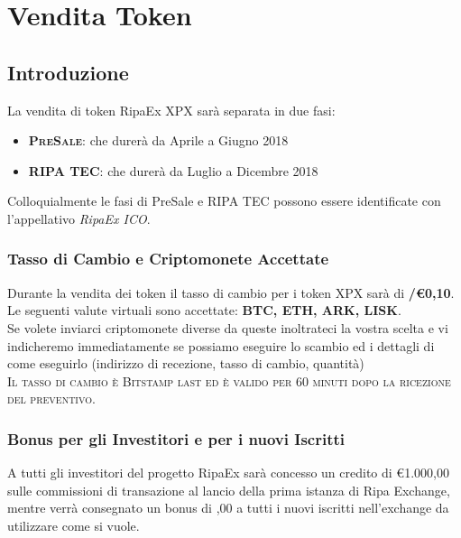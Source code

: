 
\chapter{Vendita Token}
\section{Introduzione}
La vendita di token RipaEx XPX sarà separata in due fasi:
	\begin{itemize}
		\item \textbf{\textsc{PreSale}}: che durerà da Aprile a Giugno 2018
		\item \textbf{\textsc{RIPA TEC}}: che durerà da Luglio a Dicembre 2018
	\end{itemize}
\vspace{5mm}
Colloquialmente le fasi di PreSale e RIPA TEC possono essere identificate con l'appellativo \textit{RipaEx ICO}.

\subsection{Tasso di Cambio e Criptomonete Accettate}
Durante la vendita dei token il tasso di cambio per i token XPX sarà di \textbf{\PHP/\euro0,10}.\\

Le seguenti valute virtuali sono accettate: \textbf{BTC, ETH, ARK, LISK}.\\

Se volete inviarci criptomonete diverse da queste inoltrateci la vostra scelta e vi indicheremo immediatamente
se possiamo eseguire lo scambio ed i dettagli di come eseguirlo (indirizzo di recezione, tasso di cambio,
quantità)\\

\textsc{Il tasso di cambio è Bitstamp last ed è valido per 60 minuti dopo la ricezione del preventivo}.

\subsection{Bonus per gli Investitori e per i nuovi Iscritti}
A tutti gli investitori del progetto RipaEx sarà concesso un credito di \euro1.000,00 sulle commissioni
di transazione al lancio della prima istanza di Ripa Exchange, mentre verrà consegnato un bonus di ,00
a tutti i nuovi iscritti nell'exchange da utilizzare come si vuole.

